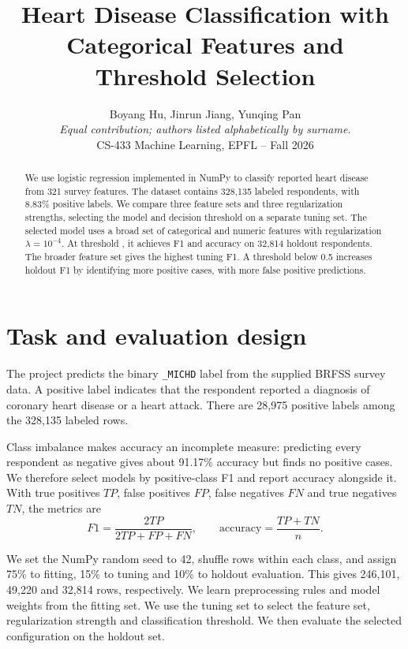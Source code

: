 \documentclass[10pt,conference,compsocconf]{IEEEtran}
\begin{document}
\title{Heart Disease Classification with Categorical Features and Threshold Selection}
\author{Boyang Hu, Jinrun Jiang, Yunqing Pan\\\textit{Equal contribution; authors listed alphabetically by surname.}\\CS-433 Machine Learning, EPFL -- Fall 2026}
\maketitle
\begin{abstract}
We use logistic regression implemented in NumPy to classify reported heart disease from 321 survey features. The dataset contains 328,135 labeled respondents, with 8.83\% positive labels. We compare three feature sets and three regularization strengths, selecting the model and decision threshold on a separate tuning set. The selected model uses a broad set of categorical and numeric features with regularization $\lambda=10^{-4}$. At threshold \SelectedThreshold{}, it achieves F1 \HoldFone{} and accuracy \HoldAccuracy{} on 32,814 holdout respondents. The broader feature set gives the highest tuning F1. A threshold below 0.5 increases holdout F1 by identifying more positive cases, with more false positive predictions.
\end{abstract}

\section{Task and evaluation design}
The project predicts the binary \texttt{\_MICHD} label from the supplied BRFSS survey data. A positive label indicates that the respondent reported a diagnosis of coronary heart disease or a heart attack. There are 28,975 positive labels among the 328,135 labeled rows.

Class imbalance makes accuracy an incomplete measure: predicting every respondent as negative gives about 91.17\% accuracy but finds no positive cases. We therefore select models by positive-class F1 and report accuracy alongside it. With true positives $TP$, false positives $FP$, false negatives $FN$ and true negatives $TN$, the metrics are
\[
F1=\frac{2TP}{2TP+FP+FN},\qquad
\mathrm{accuracy}=\frac{TP+TN}{n}.
\]


We set the NumPy random seed to 42, shuffle rows within each class, and assign 75\% to fitting, 15\% to tuning and 10\% to holdout evaluation. This gives 246,101, 49,220 and 32,814 rows, respectively. We learn preprocessing rules and model weights from the fitting set. We use the tuning set to select the feature set, regularization strength and classification threshold. We then evaluate the selected configuration on the holdout set.
\end{document}
